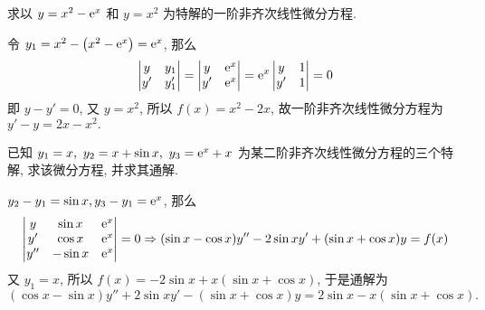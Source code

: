 \begin{example}
    求以 $y=x^2-\mathrm{e}^x$ 和 $y=x^2$ 为特解的一阶非齐次线性微分方程.
\end{example}
\begin{solution}
    令 $y_1=x^2-\qty(x^2-\mathrm{e}^x)=\mathrm{e}^x$, 那么 $$\begin{vmatrix} y & y_1 \\ y' & y'_1 \\\end{vmatrix}=\begin{vmatrix} y & \mathrm{e}^x \\ y' & \mathrm{e}^x \\\end{vmatrix}=\mathrm{e}^x\begin{vmatrix} y & 1 \\ y' & 1 \\\end{vmatrix}=0$$
    即 $y-y'=0$, 又 $y=x^2$, 所以 $f(x)=x^2-2x$, 故一阶非齐次线性微分方程为 $y'-y=2x-x^2.$
\end{solution}

\begin{example}
    已知 $y_1=x,~y_2=x+\sin x,~y_3=\mathrm{e} ^x+x$ 为某二阶非齐次线性微分方程的三个特解, 求该微分方程, 并求其通解.
\end{example}
\begin{solution}
    $y_2-y_1=\sin x, y_3-y_1=\mathrm{e}^x$, 那么 $$\begin{vmatrix} y & \sin x & \mathrm{e}^x \\ y' & \cos x & \mathrm{e}^x \\ y'' & -\sin x & \mathrm{e}^x \\\end{vmatrix}=0\Rightarrow (\sin x-\cos x)y''-2\sin xy'+(\sin x+\cos x)y=f(x)$$
    又 $y_1=x$, 所以 $f(x)=-2\sin x+x(\sin x+\cos x)$, 于是通解为
    $$
        (\cos x-\sin x)y''+2\sin xy'-(\sin x+\cos x)y=2\sin x-x(\sin x+\cos x).
    $$
\end{solution}


